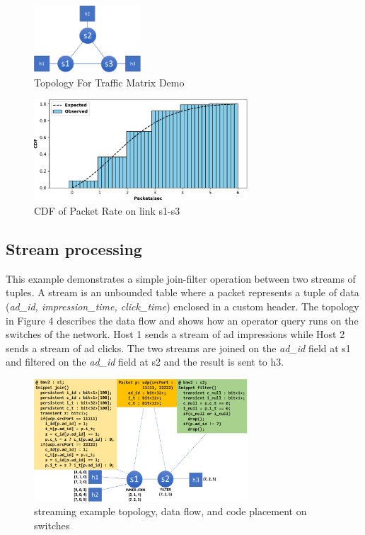 \begin{figure}[tp]
\centering
\includegraphics[width=40mm,scale=0.7]{figures/traf_mat_topo}
\caption{Topology For Traffic Matrix Demo}
\end{figure}


\begin{figure}[tp]
\centering
\includegraphics[width=80mm,scale=0.7]{figures/exp_obs_cdf}
\caption{CDF of Packet Rate on link s1-s3}
\end{figure}
  
\subsection{Stream processing}
This example demonstrates a simple join-filter operation between two streams of
tuples. A stream is an unbounded table where a packet represents a tuple of
data (\textit{ad\_id, impression\_time, click\_time}) enclosed in a custom
header. The topology in Figure 4 describes the data flow and shows how an
operator query runs on the switches of the network. Host 1 sends a stream of ad
impressions while Host 2 sends a stream of ad clicks. The two streams are
joined on the \textit{ad\_id} field at s1 and filtered on the \textit{ad\_id}
field at s2 and the result is sent to h3. 

\begin{figure}[tp]
\centering
\includegraphics[width=80mm,scale=0.7]{figures/streaming_example}
\caption{streaming example topology, data flow, and code placement on switches}
\end{figure}


